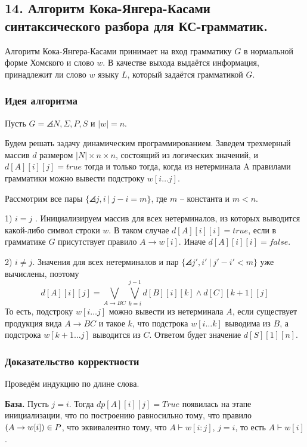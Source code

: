 \subsection{14. Алгоритм Кока-Янгера-Касами синтаксического разбора для КС-грамматик.}

Алгоритм Кока-Янгера-Касами принимает на вход грамматику $G$ в нормальной форме Хомского и слово $w$. В качестве выхода выдаётся информация, принадлежит ли слово $w$ языку $L$, который задаётся грамматикой $G$.

\subsubsection*{Идея алгоритма}

Пусть $G = \angles{N, \Sigma, P, S}$ и $|w| = n$.

Будем решать задачу динамическим программированием. Заведем трехмерный массив $d$ размером $|N| \times n \times n$, состоящий из логических значений, и $d[A][i][j]=true$  тогда и только тогда, когда из нетерминала A правилами грамматики можно вывести подстроку $w[i \ldots j]$.

Рассмотрим все пары $\{\angles{j,i}\ |\ j - i = m\}$, где $m$ -- константа и $m < n$.

1) $i = j$ . Инициализируем массив для всех нетерминалов, из которых выводится какой-либо символ строки $w$. В таком случае $d[A][i][i] = true$, если в грамматике $G$ присутствует правило $A \rightarrow w[i]$. Иначе $d[A][i][i] = false$.

2) $i \neq j$. Значения для всех нетерминалов и 
пар $\{\angles{j',i'}\ |\ j' - i' < m\}$ уже вычислены, поэтому
$$
    d[A][i][j] = \bigvee \limits_{A \rightarrow BC} 
    \bigvee \limits_{k = i}^{j - 1} d[B][i][k] \wedge d[C][k + 1][j]
$$
То есть, подстроку $w[i \ldots j]$ можно вывести из нетерминала $A$, если существует продукция вида $A \rightarrow BC$ и такое $k$, что подстрока $w[i \ldots k]$ выводима из $B$, а подстрока $w[k + 1 \ldots j]$ выводится из $C$. Ответом будет значение $d[S][1][n]$.

\subsubsection*{Доказательство корректности}

Проведём индукцию по длине слова.

\textbf{База.} Пусть $j = i$. Тогда $dp[A][i][j] = True$ появилась на этапе инициализации, что по построению равносильно тому, что правило $\left({A \rightarrow w[i]}\right) \in P$, что эквивалентно тому, что $A \vdash w[i : j]$, $j = i$, то есть $A \vdash w[i]$.


